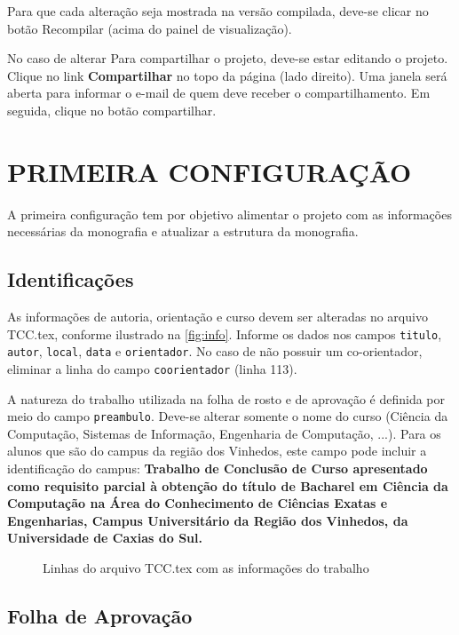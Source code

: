 Para que cada alteração seja mostrada na versão compilada, deve-se clicar no botão Recompilar (acima do painel de visualização). 

No caso de alterar Para compartilhar o projeto, deve-se estar editando o projeto. Clique no link \textbf{Compartilhar} no topo da página (lado direito). Uma janela será aberta para informar o e-mail de quem deve receber o compartilhamento. Em seguida, clique no botão compartilhar. 


\section{PRIMEIRA CONFIGURAÇÃO}
\label{sec:primeiraConfiguracao} 

A primeira configuração tem por objetivo alimentar o projeto com as informações necessárias da monografia e atualizar a estrutura da monografia. 

\subsection{Identificações}

As informações de autoria, orientação e curso devem ser alteradas no arquivo TCC.tex, conforme ilustrado na \autoref{fig:info}. Informe os dados nos campos \texttt{titulo}, \texttt{autor}, \texttt{local}, \texttt{data} e \texttt{orientador}. No caso de não possuir um co-orientador, eliminar a linha do campo \texttt{coorientador} (linha 113).

A natureza do trabalho utilizada na folha de rosto e de aprovação é definida por meio do campo \texttt{preambulo}. Deve-se alterar somente o nome do curso (Ciência da Computação, Sistemas de Informação, Engenharia de Computação, ...). Para os alunos que são do campus da região dos Vinhedos, este campo pode incluir a identificação do campus: \textbf{Trabalho de Conclusão de Curso apresentado como requisito parcial à obtenção do título de Bacharel em Ciência da Computação na Área do Conhecimento de Ciências Exatas e Engenharias, Campus Universitário da Região dos Vinhedos, da Universidade de Caxias do Sul.  
}
\begin{figure}[!ht]
	\caption{Linhas do arquivo TCC.tex com as informações do trabalho}
	\centering 
	\label{fig:info}
\end{figure}   

\subsection{Folha de Aprovação} 

